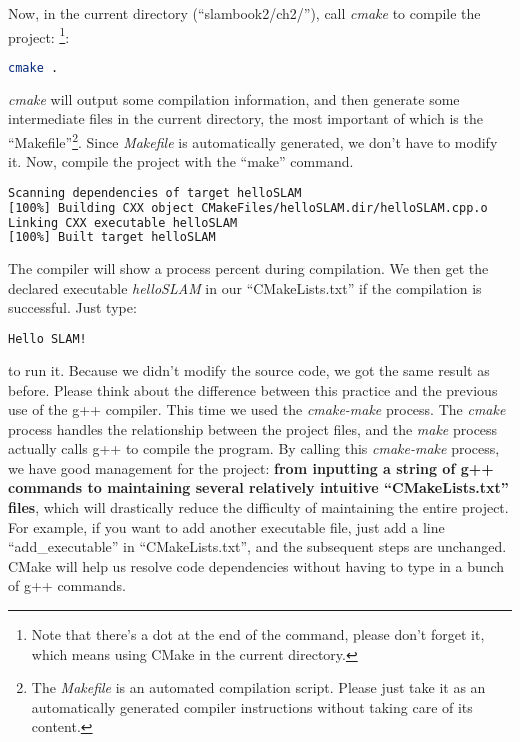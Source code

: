 Now, in the current directory (``slambook2/ch2/''), call \textit{cmake} to compile the project: \footnote{Note that there's a dot at the end of the command, please don't forget it, which means using CMake in the current directory. }:
\begin{lstlisting}[language=sh,caption=Terminal input]
cmake .
\end{lstlisting}
\textit{cmake} will output some compilation information, and then generate some intermediate files in the current directory, the most important of which is the ``Makefile''\footnote{The \textit{Makefile} is an automated compilation script. Please just take it as an automatically generated compiler instructions without taking care of its content.}. Since \textit{Makefile} is automatically generated, we don't have to modify it. Now, compile the project with the ``make'' command.
\begin{lstlisting}[language=sh,caption=Terminal input]
% make
Scanning dependencies of target helloSLAM
[100%] Building CXX object CMakeFiles/helloSLAM.dir/helloSLAM.cpp.o
Linking CXX executable helloSLAM
[100%] Built target helloSLAM
\end{lstlisting}
The compiler will show a process percent during compilation. We then get the declared executable \textit{helloSLAM} in our ``CMakeLists.txt'' if the compilation is successful. Just type:
\begin{lstlisting}[language=sh,caption=Terminal Input]
% ./helloSLAM
Hello SLAM!
\end{lstlisting}
to run it. Because we didn't modify the source code, we got the same result as before. Please think about the difference between this practice and the previous use of the g++ compiler. This time we used the \textit{cmake-make} process. The \textit{cmake} process handles the relationship between the project files, and the \textit{make} process actually calls g++ to compile the program. By calling this \textit{cmake-make} process, we have good management for the project: \textbf{from inputting a string of g++ commands to maintaining several relatively intuitive ``CMakeLists.txt'' files}, which will drastically reduce the difficulty of maintaining the entire project. For example, if you want to add another executable file, just add a line ``add\_executable'' in ``CMakeLists.txt'', and the subsequent steps are unchanged. CMake will help us resolve code dependencies without having to type in a bunch of g++ commands.

